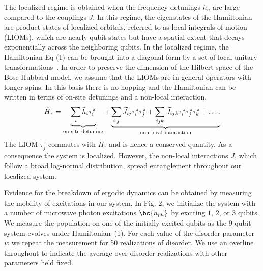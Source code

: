 The localized regime is obtained when the frequency detunings $h_n$ are large compared to the couplings $J$.
In this regime, the eigenstates of the Hamiltonian are product states of localized orbitals, referred to as local integrals of motion (LIOMs), which are nearly qubit states but have a spatial extent that decays exponentially across the neighboring qubits.
In the localized regime, the Hamiltonian Eq (1) can be brought into a diagonal form by a set of local unitary transformations~\autocite{Serbyn2013, Huse2014}.
In order to preserve the dimension of the Hilbert space of the Bose-Hubbard model, we assume that the LIOMs are in general operators with longer spins.
In this basis there is no hopping and the Hamiltonian can be written in terms of on-site detunings and a non-local interaction.
\begin{equation}
    \tilde{H}_{\tau} = \underbrace{\sum_i \widetilde{h}_i \tau^z_i}_{\text{on-site detuning}} + \underbrace{ \sum_{i,j} \widetilde{J}_{ij}\tau^z_i\tau^z_j + \sum_{ijk} \widetilde{J}_{ijk}\tau^z_i\tau^z_j\tau^z_k + \mathellipsis.}_{\text{non-local interaction}}%
\end{equation}
The LIOM $\tau^z_j$ commutes with $\tilde H_{\tau}$ and is hence a conserved quantity. As a consequence the system is localized.
However, the non-local interactions $\widetilde{J}$, which follow a broad log-normal distribution,\autocite{Varma2019} spread entanglement throughout our localized system.


Evidence for the breakdown of ergodic dynamics can be obtained by measuring the mobility of excitations in our system.
In Fig. 2, we initialize the system with a number of microwave photon excitations $\bc{n_{ph}}$  by exciting $1$, $2$, or $3$ qubits.
We measure the population on one of the initially excited qubits as the 9 qubit system evolves under Hamiltonian~(1).
For each value of the disorder parameter $w$ we repeat the measurement for 50 realizations of disorder.
We use an overline throughout to indicate the average over disorder realizations with other parameters held fixed.

